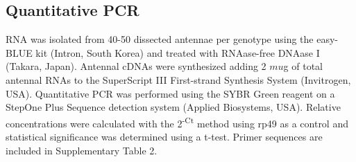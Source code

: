 \subsection*{Quantitative PCR}

RNA was isolated from 40-50 dissected antennae per genotype using the easy-BLUE kit (Intron, South Korea) and treated with RNAase-free DNAase I (Takara, Japan). Antennal cDNAs were synthesized adding 2 $mu$g of total antennal RNAs to the SuperScript III First-strand Synthesis System (Invitrogen, USA). Quantitative PCR was performed using the SYBR Green reagent on a StepOne Plus Sequence detection system (Applied Biosystems, USA). Relative concentrations were calculated with the 2\textsuperscript{-\Delta{}\Delta{}Ct} method using rp49 as a control and statistical significance was determined using a t-test. Primer sequences are included in Supplementary Table 2.
